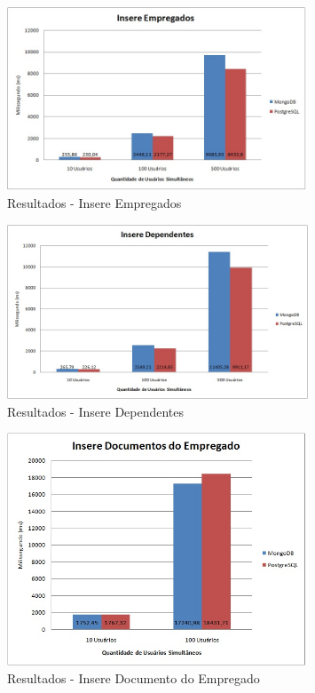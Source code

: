 \begin{figure}[!htbp]
	\begin{center}
		\includegraphics[width=0.8\textwidth]{resultados/insere_empregados}
	\end{center}
	\caption{Resultados - Insere Empregados}
	\label{fig:resultinsereempregados}
\end{figure}

\begin{figure}[!htbp]
	\begin{center}
		\includegraphics[width=0.8\textwidth]{resultados/insere_dependentes}
	\end{center}
	\caption{Resultados - Insere Dependentes}
	\label{fig:resultinseredependentes}
\end{figure}

\begin{figure}[!htbp]
	\begin{center}
		\includegraphics[width=0.8\textwidth]{resultados/insere_doc_empregado}
	\end{center}
	\caption{Resultados - Insere Documento do Empregado}
	\label{fig:resultinseredocempregado}
\end{figure}


